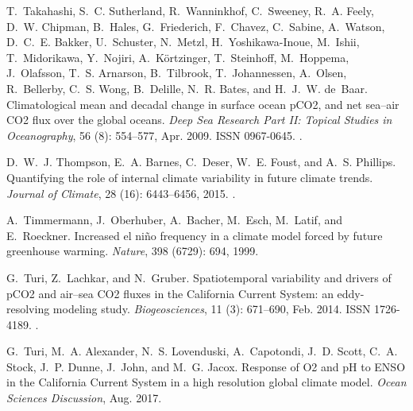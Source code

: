 \documentclass[hvmath, online,bgd]{copernicus_discussions}
\begin{document}
\begin{thebibliography}{84}
	T.~Takahashi, S.~C. Sutherland, R.~Wanninkhof, C.~Sweeney, R.~A. Feely, D.~W.
	Chipman, B.~Hales, G.~Friederich, F.~Chavez, C.~Sabine, A.~Watson, D.~C.~E.
	Bakker, U.~Schuster, N.~Metzl, H.~Yoshikawa-Inoue, M.~Ishii, T.~Midorikawa,
	Y.~Nojiri, A.~K{\"o}rtzinger, T.~Steinhoff, M.~Hoppema, J.~Olafsson, T.~S.
	Arnarson, B.~Tilbrook, T.~Johannessen, A.~Olsen, R.~Bellerby, C.~S. Wong,
	B.~Delille, N.~R. Bates, and H.~J.~W. de~Baar.
	\newblock Climatological mean and decadal change in surface ocean {pCO}2, and
	net sea--air {CO}2 flux over the global oceans.
	\newblock \emph{Deep Sea Research Part II: Topical Studies in Oceanography},
	56 (8): 554--577, Apr. 2009.
	\newblock ISSN 0967-0645.
	\newblock {}.
	
	D.~W.~J. Thompson, E.~A. Barnes, C.~Deser, W.~E. Foust, and A.~S. Phillips.
	\newblock Quantifying the role of internal climate variability in future
	climate trends.
	\newblock \emph{Journal of Climate}, 28 (16): 6443--6456,
	2015.
	\newblock {}.
	
	A.~Timmermann, J.~Oberhuber, A.~Bacher, M.~Esch, M.~Latif, and E.~Roeckner.
	\newblock Increased el ni{\~n}o frequency in a climate model forced by future
	greenhouse warming.
	\newblock \emph{Nature}, 398 (6729): 694, 1999.
	
	G.~Turi, Z.~Lachkar, and N.~Gruber.
	\newblock Spatiotemporal variability and drivers of {pCO}2 and air--sea {CO}2
	fluxes in the {California} {Current} {System}: an eddy-resolving modeling
	study.
	\newblock \emph{Biogeosciences}, 11 (3): 671--690, Feb. 2014.
	\newblock ISSN 1726-4189.
	\newblock {}.
	
	G.~Turi, M.~A. Alexander, N.~S. Lovenduski, A.~Capotondi, J.~D. Scott, C.~A.
	Stock, J.~P. Dunne, J.~John, and M.~G. Jacox.
	\newblock Response of {O}2 and {pH} to {ENSO} in the {California} {Current}
	{System} in a high resolution global climate model.
	\newblock \emph{Ocean Sciences Discussion}, Aug. 2017.
	

\end{thebibliography}
\end{document}
